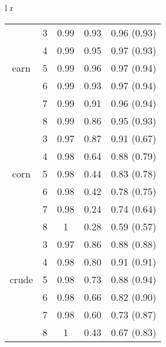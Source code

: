 \begin{tabular}{l r}
\begin{tabular}{| c | c | c | c | c | }
	
	
	& 3 & 0.99 & 0.93 & 0.96  (0.93)   \\ 
& 4 & 0.99 & 0.95 &  0.97  (0.93)  \\
earn	& 5 & 0.99 & 0.96 & 0.97   (0.94)  \\ 
& 6 & 0.99 & 0.93 & 0.97  (0.94)   \\
& 7 & 0.99 & 0.91 & 0.96 (0.94)    \\
& 8 & 0.99 & 0.86 & 0.95  (0.93)   \\\hline

	
	
	
	& 3 & 0.97 & 0.87 & 0.91  (0.67)   \\ 
	& 4 & 0.98 & 0.64 & 0.88  (0.79)   \\ 
	corn	& 5 & 0.98 & 0.44 &  0.83  (0.78)  \\ 
	& 6 & 0.98 & 0.42 & 0.78   (0.75)  \\ 
	& 7 & 0.98 & 0.24 & 0.74  (0.64)  \\ 
	& 8 & 1 & 0.28& 0.59  (0.57)   \\ \hline
	
	
	& 3 & 0.97 & 0.86 &  0.88  (0.88)  \\ 
	& 4 & 0.98 & 0.80 & 0.91  (0.91)   \\ 
	crude & 5 & 0.98 & 0.73 &  0.88 (0.94)   \\ 
	& 6 & 0.98 & 0.66 &  0.82  (0.90)  \\
	& 7 & 0.98 & 0.60 &  0.73 (0.87)  \\
	& 8 & 1 & 0.43 &  0.67   (0.83) \\ \hline 
	
	
	
\end{tabular} \\

\end{tabular} %




